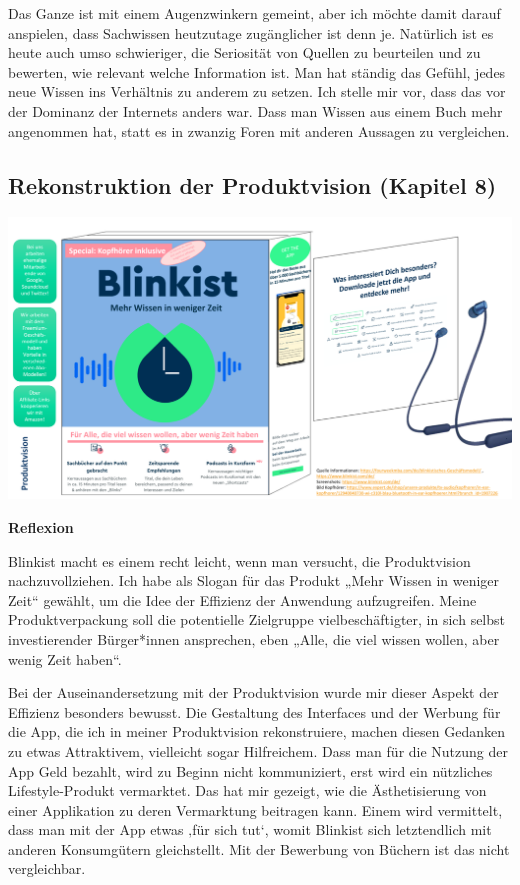 \documentclass[
  a4paper,
]{book}
\begin{document}
Das Ganze ist mit einem Augenzwinkern gemeint, aber ich möchte damit darauf anspielen, dass Sachwissen heutzutage zugänglicher ist denn je. Natürlich ist es heute auch umso schwieriger, die Seriosität von Quellen zu beurteilen und zu bewerten, wie relevant welche Information ist. Man hat ständig das Gefühl, jedes neue Wissen ins Verhältnis zu anderem zu setzen. Ich stelle mir vor, dass das vor der Dominanz der Internets anders war. Dass man Wissen aus einem Buch mehr angenommen hat, statt es in zwanzig Foren mit anderen Aussagen zu vergleichen.

\subsection*{Rekonstruktion der Produktvision (Kapitel 8)}\label{rekonstruktion-der-produktvision-kapitel-8}

\begin{center}\includegraphics{Figures/08-Bsp.1} \end{center}

\textbf{Reflexion}

Blinkist macht es einem recht leicht, wenn man versucht, die Produktvision nachzuvollziehen. Ich habe als Slogan für das Produkt „Mehr Wissen in weniger Zeit`` gewählt, um die Idee der Effizienz der Anwendung aufzugreifen. Meine Produktverpackung soll die potentielle Zielgruppe vielbeschäftigter, in sich selbst investierender Bürger*innen ansprechen, eben „Alle, die viel wissen wollen, aber wenig Zeit haben``.

Bei der Auseinandersetzung mit der Produktvision wurde mir dieser Aspekt der Effizienz besonders bewusst. Die Gestaltung des Interfaces und der Werbung für die App, die ich in meiner Produktvision rekonstruiere, machen diesen Gedanken zu etwas Attraktivem, vielleicht sogar Hilfreichem. Dass man für die Nutzung der App Geld bezahlt, wird zu Beginn nicht kommuniziert, erst wird ein nützliches Lifestyle-Produkt vermarktet. Das hat mir gezeigt, wie die Ästhetisierung von einer Applikation zu deren Vermarktung beitragen kann. Einem wird vermittelt, dass man mit der App etwas ‚für sich tut`, womit Blinkist sich letztendlich mit anderen Konsumgütern gleichstellt. Mit der Bewerbung von Büchern ist das nicht vergleichbar.
\end{document}
